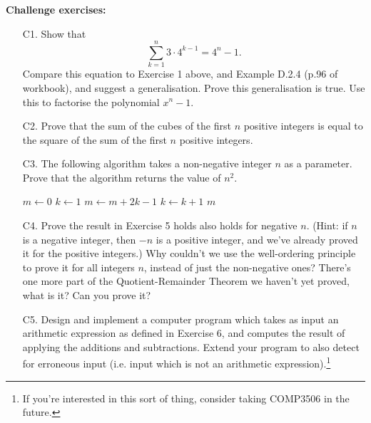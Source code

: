 \documentclass[a4paper,12pt]{article}
\begin{document}
\newpage

{\bf Challenge exercises:}

\begin{enumerate}
\item[C1.] Show that
\[
    \sum_{k=1}^n 3 \cdot 4^{k-1} = 4^n - 1.
\]
Compare this equation to Exercise 1 above, and Example D.2.4 (p.96 of
workbook), and suggest a generalisation. Prove this generalisation is true.
Use this to factorise the polynomial $x^n - 1$.
\item[C2.] Prove that the sum of the cubes of the first $n$ positive integers is
equal to the square of the sum of the first $n$ positive integers.
\item[C3.]
The following algorithm takes a non-negative integer $n$ as a parameter. Prove
that the algorithm returns the value of $n^2$.
\begin{algorithmic}
    \State $m \gets 0$
    \State $k \gets 1$
        \State $m \gets m + 2k - 1$
        \State $k \gets k + 1$
    \EndWhile
    \State \Return $m$
\EndFunction
\end{algorithmic}
\item[C4.]
Prove the result in Exercise 5 holds also holds for negative $n$.
(Hint: if $n$ is a negative integer, then $-n$ is a positive integer, and we've
already proved it for the positive integers.)
Why couldn't we use the well-ordering principle to prove it for all integers
$n$, instead of just the non-negative ones?
There's one more part of the Quotient-Remainder Theorem we haven't yet proved,
what is it? Can you prove it?
\item[C5.]
Design and implement a computer program which takes as input an arithmetic
expression as defined in Exercise 6, and computes the result of applying the
additions and subtractions. Extend your program to also detect for erroneous
input (i.e. input which is not an arithmetic expression).\footnote{If you're
interested in this sort of thing, consider taking COMP3506 in the future.}
\end{enumerate}
\end{document}
